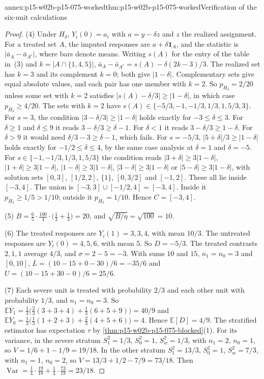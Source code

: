 \begin{annexitem}{annex:p15-w02b-p15-075-worked}{thm:p15-w02b-p15-075-worked}{Verification of the six-unit calculations}
\begin{proof}
(4) Under \(H_\delta\), \(Y_i(0)=a_i\) with \(a=y-\delta z\) and
\(z\) the realized assignment. For a treated set \(A\), the imputed responses
are \(a+\delta\mathbf1_A\), and the statistic is
\(|\bar a_A-\bar a_{A^c}|\), where bars denote means. Writing \(s(A)\) for
the entry of the table in~(3) and \(k=|A\cap\{1,4,5\}|\),
\(\bar a_A-\bar a_{A^c}=s(A)-\delta(2k-3)/3\). The realized set has
\(k=3\) and its complement \(k=0\); both give \(|1-\delta|\). Complementary
sets give equal absolute values, and each pair has one member with \(k=2\).
So \(p_{H_\delta}=2/20\) unless some set with \(k=2\) satisfies
\(|s(A)-\delta/3|\geq|1-\delta|\), in which case \(p_{H_\delta}\geq4/20\).
The sets with \(k=2\) have \(s(A)\in\{-5/3,-1,-1/3,1/3,1,5/3,3\}\). For
\(s=3\), the condition \(|3-\delta/3|\geq|1-\delta|\) holds exactly for
\(-3\leq\delta\leq3\). For \(\delta\geq1\) and \(\delta\leq9\) it reads
\(3-\delta/3\geq\delta-1\). For \(\delta<1\) it reads
\(3-\delta/3\geq1-\delta\). For \(\delta>9\) it would need
\(\delta/3-3\geq\delta-1\), which fails. For \(s=-5/3\),
\(|5+\delta|/3\geq|1-\delta|\) holds exactly for \(-1/2\leq\delta\leq4\),
by the same case analysis at \(\delta=1\) and \(\delta=-5\). For
\(s\in\{-1,-1/3,1/3,1,5/3\}\) the condition reads \(|3+\delta|\geq3|1-\delta|\),
\(|1+\delta|\geq3|1-\delta|\), \(|1-\delta|\geq3|1-\delta|\),
\(|3-\delta|\geq3|1-\delta|\) or \(|5-\delta|\geq3|1-\delta|\), with solution
sets \([0,3]\), \([1/2,2]\), \(\{1\}\), \([0,3/2]\) and \([-1,2]\). These all
lie inside \([-3,4]\). The union is \([-3,3]\cup[-1/2,4]=[-3,4]\). Inside it
\(p_{H_\delta}\geq1/5>1/10\); outside it \(p_{H_\delta}=1/10\). Hence
\(C=[-3,4]\).

(5) \(B=\frac65\cdot\frac{100}4\cdot\bigl(\frac13+\frac13\bigr)=20\), and
\(\sqrt{B/\eta}=\sqrt{100}=10\).

(6) The treated responses are \(Y_i(1)=3,3,4\), with mean \(10/3\). The
untreated responses are \(Y_i(0)=4,5,6\), with mean \(5\). So \(D=-5/3\). The
treated contrasts \(2,1,1\) average \(4/3\), and
\(\sigma=2-5=-3\). With sums \(10\) and \(15\), \(n_1=n_0=3\) and \([0,10]\),
\(L=(10-15+0-30)/6=-35/6\) and \(U=(10-15+30-0)/6=25/6\).

(7) Each severe unit is treated with probability \(2/3\) and each other unit
with probability \(1/3\), and \(n_1=n_0=3\). So
\(\mathbb E\overline Y_1=\tfrac13\bigl(\tfrac23(3+3+4)+\tfrac13(6+5+9)\bigr)=40/9\)
and \(\mathbb E\overline Y_0=\tfrac13\bigl(\tfrac13(1+2+3)+\tfrac23(4+5+6)\bigr)=4\).
Hence \(\mathbb E[D]=4/9\). The stratified estimator has expectation \(\tau\)
by \cref{thm:p15-w02b-p15-075-blocked}(1). For its variance, in the severe
stratum \(S_{1}^2=1/3\), \(S_0^2=1\), \(S_w^2=1/3\), with
\(n_1=2\), \(n_0=1\), so \(V=1/6+1-1/9=19/18\). In the other stratum
\(S_1^2=13/3\), \(S_0^2=1\), \(S_w^2=7/3\), with \(n_1=1\), \(n_0=2\), so
\(V=13/3+1/2-7/9=73/18\). Then
\(\operatorname{Var}=\tfrac14\cdot\tfrac{19}{18}+\tfrac14\cdot\tfrac{73}{18}=23/18\).


\end{proof}
\end{annexitem}
